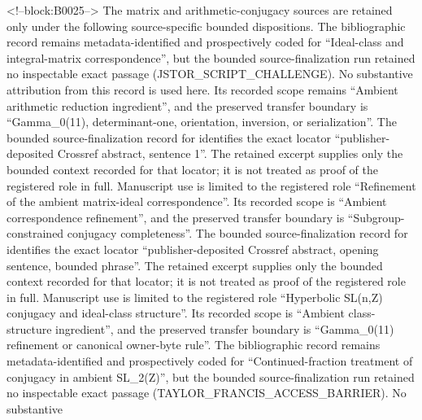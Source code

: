 \documentclass[11pt]{article}
\begin{document}
<!--block:B0025-->
The matrix and arithmetic-conjugacy sources are retained only under the following source-specific bounded dispositions.
The bibliographic record \citep{P31-S07} remains metadata-identified and
prospectively coded for ``Ideal-class and integral-matrix correspondence'', but the bounded source-finalization
run retained no inspectable exact passage (JSTOR\_SCRIPT\_CHALLENGE).  No substantive
attribution from this record is used here.  Its recorded scope remains
``Ambient arithmetic reduction ingredient'', and the preserved transfer boundary is ``Gamma\_0(11), determinant-one, orientation, inversion, or serialization''.
The bounded source-finalization record for \citep{P31-S08} identifies
the exact locator ``publisher-deposited Crossref abstract, sentence 1''.  The retained excerpt supplies only the
bounded context recorded for that locator; it is not treated as proof of the
registered role in full.  Manuscript use is limited to the registered role ``Refinement of the ambient matrix-ideal correspondence''.
Its recorded scope is ``Ambient correspondence refinement'', and the preserved
transfer boundary is ``Subgroup-constrained conjugacy completeness''.
The bounded source-finalization record for \citep{P31-S09} identifies
the exact locator ``publisher-deposited Crossref abstract, opening sentence, bounded phrase''.  The retained excerpt supplies only the
bounded context recorded for that locator; it is not treated as proof of the
registered role in full.  Manuscript use is limited to the registered role ``Hyperbolic SL(n,Z) conjugacy and ideal-class structure''.
Its recorded scope is ``Ambient class-structure ingredient'', and the preserved
transfer boundary is ``Gamma\_0(11) refinement or canonical owner-byte rule''.
The bibliographic record \citep{P31-S10} remains metadata-identified and
prospectively coded for ``Continued-fraction treatment of conjugacy in ambient SL\_2(Z)'', but the bounded source-finalization
run retained no inspectable exact passage (TAYLOR\_FRANCIS\_ACCESS\_BARRIER).  No substantive
\end{document}
